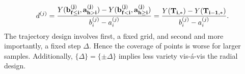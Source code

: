 \documentclass[a4paper,12pt]{article}
\begin{document}
\begin{align}
d^{(j)} =  \frac{Y(\bold{b_{f \leq i}^{(j)}}, \bold{a_{h>i}^{(j)}}) - Y(\bold{b_{f<i}^{(j)}}, \bold{a_{h \geq i}^{(j)}})}{b_i^{(j)} - a_i^{(j)}} = \frac{Y(\bold{T_{i,*})} -  Y(\bold{T_{i-1,*}})}{b_i^{(j)} - a_i^{(j)}}.
\end{align}
The trajectory design involves first, a fixed grid, and second and more importantly, a fixed step $\Delta$. Hence the coverage of points is worse for larger samples. Additionally, $\{\Delta\} = \{\pm \Delta\}$ implies less variety vis-á-vis the radial design.












\newpage

\end{document}
